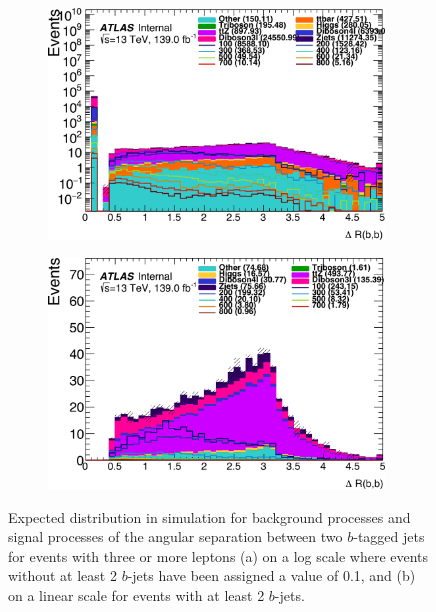 \begin{figure}[tbp]
    \centering
    \begin{subfigure}[b]{0.49\textwidth}
      \centering
      \includegraphics[width=0.98\textwidth]{figs/rpvthreel/dRbb_PreSel_logy_incl.png}
      \caption{}
      \label{fig:dRbb_PreSel_logy}
    \end{subfigure}
    \hfill
    \begin{subfigure}[b]{0.49\textwidth}
      \centering
      \includegraphics[width=0.98\textwidth]{figs/rpvthreel/dRbb_PreSel.png}
      \caption{}
      \label{fig:dRbb_Presel_lin}
    \end{subfigure}
  \caption{Expected distribution in simulation for background processes and signal processes of the angular separation between two $b$-tagged jets for events with three or more leptons (a) on a log scale where events without at least 2 $b$-jets have been assigned a value of 0.1, and (b) on a linear scale for events with at least 2 $b$-jets.}
          \label{fig:dRbb_PreSel}
\end{figure}
